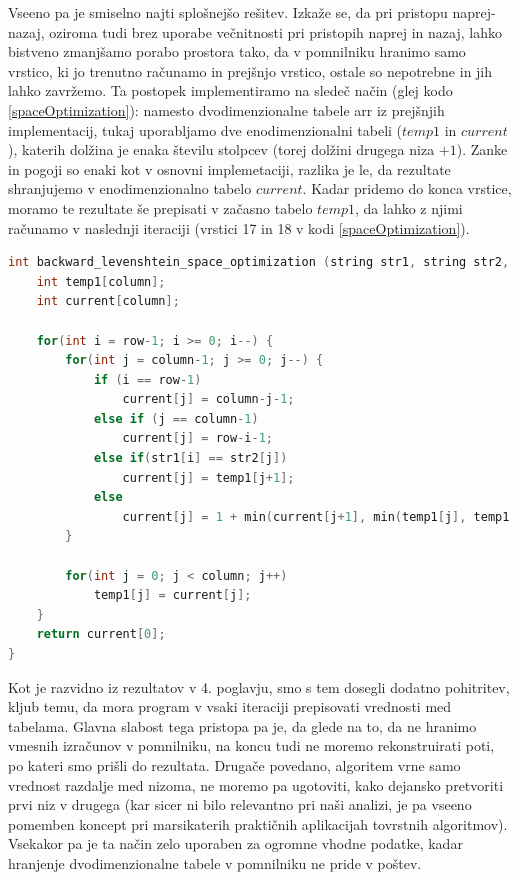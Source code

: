 \documentclass[a4paper,12pt,openright]{book}
\begin{document}
Vseeno pa je smiselno najti splošnejšo rešitev. Izkaže se, da pri pristopu naprej-nazaj, oziroma tudi brez uporabe večnitnosti pri pristopih naprej in nazaj, lahko bistveno zmanjšamo porabo prostora tako, da v pomnilniku hranimo samo vrstico, ki jo trenutno računamo in prejšnjo vrstico, ostale so nepotrebne in jih lahko zavržemo. Ta postopek implementiramo na sledeč način (glej kodo \ref{spaceOptimization}): namesto dvodimenzionalne tabele arr iz prejšnjih implementacij, tukaj uporabljamo dve enodimenzionalni tabeli ($temp1$ in $current$), katerih dolžina je enaka številu stolpcev (torej dolžini drugega niza $+ 1$). Zanke in pogoji so enaki kot v osnovni implemetaciji, razlika je le, da rezultate shranjujemo v enodimenzionalno tabelo $current$. Kadar pridemo do konca vrstice, moramo te rezultate še prepisati v začasno tabelo $temp1$, da lahko z njimi računamo v naslednji iteraciji (vrstici 17 in 18 v kodi \ref{spaceOptimization}). 

\bigskip
\bigskip

\begin{lstlisting}[language=C++, caption={Prostorska optimizacija za računanje Levenshteinove razdalje s pristopom nazaj}, captionpos=b, label=spaceOptimization]
int backward_levenshtein_space_optimization (string str1, string str2, int row, int column) {
    int temp1[column]; 
    int current[column];

    for(int i = row-1; i >= 0; i--) {
        for(int j = column-1; j >= 0; j--) {
            if (i == row-1)
                current[j] = column-j-1;
            else if (j == column-1)
                current[j] = row-i-1;
            else if(str1[i] == str2[j])
                current[j] = temp1[j+1];
            else
                current[j] = 1 + min(current[j+1], min(temp1[j], temp1[j+1]));
        }

        for(int j = 0; j < column; j++) 
            temp1[j] = current[j];
    }
    return current[0];
}
\end{lstlisting}

\bigskip
\bigskip

Kot je razvidno iz rezultatov v 4. poglavju, smo s tem dosegli dodatno pohitritev, kljub temu, da mora program v vsaki iteraciji prepisovati vrednosti med tabelama. Glavna slabost tega pristopa pa je, da glede na to, da ne hranimo vmesnih izračunov v pomnilniku, na koncu tudi ne moremo rekonstruirati poti, po kateri smo prišli do rezultata. Drugače povedano, algoritem vrne samo vrednost razdalje med nizoma, ne moremo pa ugotoviti, kako dejansko pretvoriti prvi niz v drugega (kar sicer ni bilo relevantno pri naši analizi, je pa vseeno pomemben koncept pri marsikaterih praktičnih aplikacijah tovrstnih algoritmov). Vsekakor pa je ta način zelo uporaben za ogromne vhodne podatke, kadar hranjenje dvodimenzionalne tabele v pomnilniku ne pride v poštev. 
\end{document}

